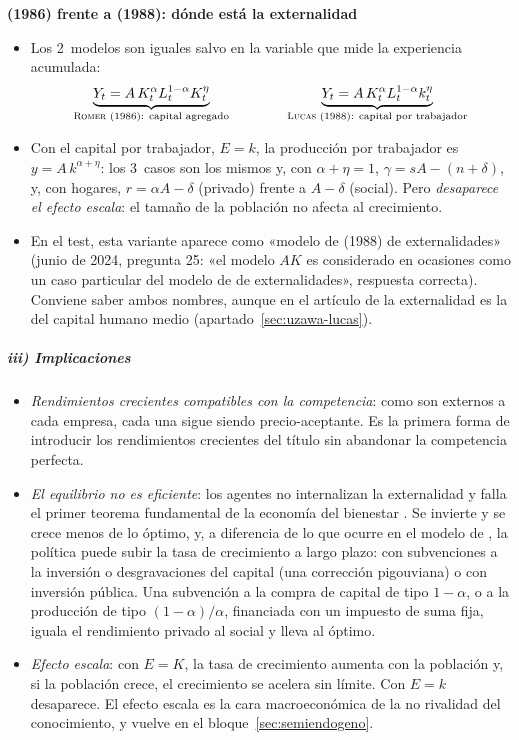 \documentclass[11pt]{article}
\begin{document}
\begin{anotaciones}
\textbf{ (1986) frente a  (1988): dónde está la externalidad}
\begin{itemize}
\item Los 2~modelos son iguales salvo en la variable que mide la experiencia acumulada:
  \[\underbrace{Y_t=A\,K_t^{\alpha}L_t^{1-\alpha}K_t^{\eta}}_{\text{\textsc{Romer} (1986): capital agregado}}\qquad\qquad\underbrace{Y_t=A\,K_t^{\alpha}L_t^{1-\alpha}k_t^{\eta}}_{\text{\textsc{Lucas} (1988): capital por trabajador}}\]
\item Con el capital por trabajador, $E=k$, la producción por trabajador es $y=A\,k^{\alpha+\eta}$: los 3~casos son los mismos y, con $\alpha+\eta=1$, $\gamma=sA-(n+\delta)$, y, con hogares, $r=\alpha A-\delta$ (privado) frente a $A-\delta$ (social). Pero \emph{desaparece el efecto escala}: el tamaño de la población no afecta al crecimiento.
\item En el test, esta variante aparece como «modelo de  (1988) de externalidades» (junio de 2024, pregunta 25: «el modelo $AK$ es considerado en ocasiones como un caso particular del modelo de  de externalidades», respuesta correcta). Conviene saber ambos nombres, aunque en el artículo de \textcite{Lucas1988} la externalidad es la del capital humano medio (apartado~\ref{sec:uzawa-lucas})\nocite{BarroSalaiMartin2004}\nocite{Acemoglu2009}.
\end{itemize}
\end{anotaciones}

\subparagraph{iii) Implicaciones}

\begin{itemize}
\item \emph{Rendimientos crecientes compatibles con la competencia}: como son externos a cada empresa, cada una sigue siendo precio-aceptante. Es la primera forma de introducir los rendimientos crecientes del título sin abandonar la competencia perfecta.
\item \emph{El equilibrio no es eficiente}: los agentes no internalizan la externalidad y falla el primer teorema fundamental de la economía del bienestar . Se invierte y se crece menos de lo óptimo, y, a diferencia de lo que ocurre en el modelo de , la política puede subir la tasa de crecimiento a largo plazo: con subvenciones a la inversión o desgravaciones del capital (una corrección pigouviana) o con inversión pública. Una subvención a la compra de capital de tipo $1-\alpha$, o a la producción de tipo $(1-\alpha)/\alpha$, financiada con un impuesto de suma fija, iguala el rendimiento privado al social y lleva al óptimo\nocite{BarroSalaiMartin2004}.
\item \emph{Efecto escala}: con $E=K$, la tasa de crecimiento aumenta con la población y, si la población crece, el crecimiento se acelera sin límite. Con $E=k$ desaparece. El efecto escala es la cara macroeconómica de la no rivalidad del conocimiento, y vuelve en el bloque~\ref{sec:semiendogeno}.
\end{itemize}
\end{document}
